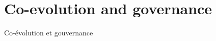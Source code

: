 




\section{Co-evolution and governance}{Co-évolution et gouvernance} 


\label{sec:lutecia}






